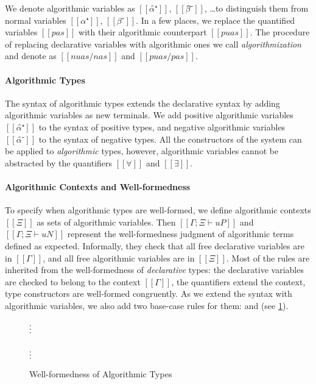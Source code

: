 We denote algorithmic variables as $[[α̂⁺]]$, $[[β̂⁻]]$, \dots to distinguish them from
normal variables $[[α⁺]]$, $[[β⁻]]$.
In a few places, we replace the quantified variables $[[pas]]$ 
with their algorithmic counterpart $[[puas]]$.
The procedure of replacing declarative variables with algorithmic ones we call 
\emph{algorithmization} and denote as $[[ nuas/nas ]]$ and $[[ puas/pas ]]$.

\paragraph{Algorithmic Types}
The syntax of algorithmic types extends the declarative syntax by adding
algorithmic variables as new terminals. We add positive algorithmic variables $[[α̂⁺]]$ 
to the syntax of positive types, and negative algorithmic variables $[[α̂⁻]]$ to the 
syntax of negative types. All the constructors of the system can be applied 
to \emph{algorithmic} types, however, algorithmic variables cannot be abstracted by the
quantifiers $[[∀]]$ and $[[∃]]$.

\paragraph{Algorithmic Contexts and Well-formedness}
To specify when algorithmic types are well-formed, 
we define algorithmic contexts $[[Ξ]]$ as sets of algorithmic variables.
Then $[[Γ ; Ξ ⊢ uP]]$ and $[[Γ ; Ξ ⊢ uN]]$ represent the well-formedness
judgment of algorithmic terms defined as expected. 
Informally, they check that all free declarative variables are in $[[Γ]]$, 
and all free algorithmic variables are in $[[Ξ]]$.
Most of the rules are inherited from the well-formedness of 
\emph{declarative} types: the declarative variables are
checked to belong to the context $[[Γ]]$, the quantifiers extend the context,
type constructors are well-formed congruently.
As we extend the syntax with algorithmic variables, we also add 
two base-case rules for them:
  and  
 (see \cref{fig:algo-wf}).

\begin{figure}[h]
\begin{multicols}{2}
  $\vcenter{\hbox{\vdots}}$\\
  \ottusedrule{\ottdruleWFATPUVarLabeled{}}
  \columnbreak\\
  $\vcenter{\hbox{\vdots}}$\\
  \ottusedrule{\ottdruleWFATNUVarLabeled{}}
\end{multicols}
\caption{Well-formedness of Algorithmic Types}
\label{fig:algo-wf}
\end{figure}

